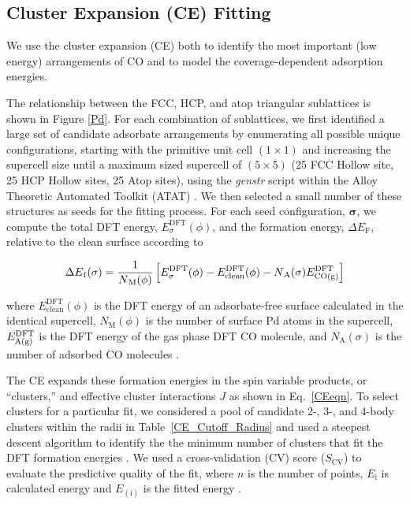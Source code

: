 \documentclass[11pt]{article}
\begin{document}
\subsection{Cluster Expansion (CE) Fitting}
We use the cluster expansion (CE) both to identify the most important (low energy) arrangements of CO and to model the coverage-dependent adsorption energies. \par 
The relationship between the FCC, HCP, and atop triangular sublattices is shown in Figure \ref{Pd}.  For each combination of sublattices, we first identified a large set of candidate adsorbate arrangements by enumerating all possible unique configurations, starting with the primitive unit cell $(1 \times 1)$ and increasing the supercell size until a maximum sized supercell of $(5 \times 5)$ (25 FCC Hollow site, 25 HCP Hollow sites, 25 Atop sites), using the \emph{genstr} script within the Alloy Theoretic Automated Toolkit (ATAT) \cite{VandeWalle2009, VandeWalle2002, VandeWalle2003, VandeWalle2002a}.  
We then selected a small number of these structures as seeds for the fitting process.  For each seed configuration, $\boldsymbol{\sigma}$, we compute the total DFT energy, $E_\sigma^\mathrm{DFT}(\phi)$, and the formation energy, $\Delta E_\mathrm{F}$, relative to the clean surface according to 

\begin{equation} \label{energy_formation}
	\Delta E{_\mathrm{f}}(\sigma)=\frac{1}{N{_\mathrm{M}}(\phi)}\left[E_{\sigma}^{\mathrm{DFT}}(\phi)-E_{\mathrm{clean}}^{\mathrm{DFT}}(\phi)-N{_\mathrm{A}}(\sigma)E_{\ce{CO(g)}}^{\mathrm{DFT}}\right]
\end{equation}

where $E_{\mathrm{clean}}^{\mathrm{DFT}}(\phi)$ is the DFT energy of an adsorbate-free surface calculated in the identical supercell, $N_{\mathrm{M}}(\phi)$ is the number of surface Pd atoms in the supercell, $E_{\ce{A(g)}}^{\mathrm{DFT}}$ is the DFT energy of the gas phase DFT CO molecule, and $N_{\mathrm{A}}(\sigma)$ is the number of adsorbed CO molecules \cite{Bray2013b}.

The CE expands these formation energies in the spin variable products,
or ``clusters,'' and effective cluster interactions $J$ as shown in Eq.~\ref{CEeqn}.
To select clusters for a particular fit, we considered a pool of candidate 2-, 3-, and 4-body clusters within the radii in Table~\ref{CE_Cutoff_Radius} and used a steepest descent algorithm to identify the the minimum number of clusters that fit the DFT formation energies \cite{Bray2013}. We used a cross-validation (CV) score ($S_\mathrm{CV}$) to evaluate the predictive quality of the fit, where $n$ is the number of points, $E_\mathrm{i}$ is calculated energy and $E_{(\mathrm{i})}$ is the fitted energy \cite{VandeWalle2002a, Zhang1993, Shao1993, Arlot2010}. 
\end{document}
